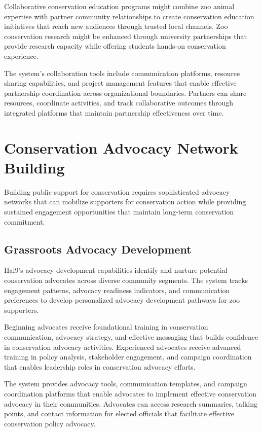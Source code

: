 \documentclass[
  Letterpaper,
]{scrbook}
\begin{document}
Collaborative conservation education programs might combine zoo animal
expertise with partner community relationships to create conservation
education initiatives that reach new audiences through trusted local
channels. Zoo conservation research might be enhanced through university
partnerships that provide research capacity while offering students
hands-on conservation experience.

The system's collaboration tools include communication platforms,
resource sharing capabilities, and project management features that
enable effective partnership coordination across organizational
boundaries. Partners can share resources, coordinate activities, and
track collaborative outcomes through integrated platforms that maintain
partnership effectiveness over time.

\section{Conservation Advocacy Network
Building}\label{conservation-advocacy-network-building}

Building public support for conservation requires sophisticated advocacy
networks that can mobilize supporters for conservation action while
providing sustained engagement opportunities that maintain long-term
conservation commitment.

\subsection{Grassroots Advocacy
Development}\label{grassroots-advocacy-development}

Hal9's advocacy development capabilities identify and nurture potential
conservation advocates across diverse community segments. The system
tracks engagement patterns, advocacy readiness indicators, and
communication preferences to develop personalized advocacy development
pathways for zoo supporters.

Beginning advocates receive foundational training in conservation
communication, advocacy strategy, and effective messaging that builds
confidence in conservation advocacy activities. Experienced advocates
receive advanced training in policy analysis, stakeholder engagement,
and campaign coordination that enables leadership roles in conservation
advocacy efforts.

The system provides advocacy tools, communication templates, and
campaign coordination platforms that enable advocates to implement
effective conservation advocacy in their communities. Advocates can
access research summaries, talking points, and contact information for
elected officials that facilitate effective conservation policy
advocacy.
\end{document}
